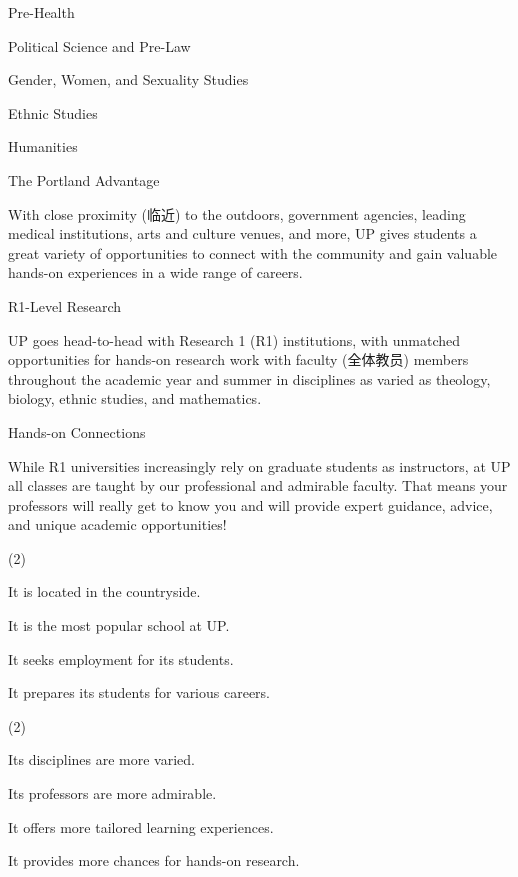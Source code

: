\documentclass{英语试卷}
\begin{document}
\par Pre-Health\par
\par Political Science and Pre-Law\par
\par Gender, Women, and Sexuality Studies\par
\par Ethnic Studies\par
\par Humanities\par
\par The Portland Advantage\par
\par With close proximity (临近) to the outdoors, government agencies, leading medical institutions, arts and culture venues, and more, UP gives students a great variety of opportunities to connect with the community and gain valuable hands-on experiences in a wide range of careers.\par
\par R1-Level Research\par
\par UP goes head-to-head with Research 1 (R1) institutions, with unmatched opportunities for hands-on research work with faculty (全体教员) members throughout the academic year and summer in disciplines as varied as theology, biology, ethnic studies, and mathematics.\par
\par Hands-on Connections\par
\par While R1 universities increasingly rely on graduate students as instructors, at UP all classes are taught by our professional and admirable faculty. That means your professors will really get to know you and will provide expert guidance, advice, and unique academic opportunities!\par
{}
\begin{choices}(2)
  \item It is located in the countryside.
  \item It is the most popular school at UP.
  \item It seeks employment for its students.
  \item It prepares its students for various careers.
\end{choices}
\begin{choices}(2)
  \item Its disciplines are more varied.
  \item Its professors are more admirable.
  \item It offers more tailored learning experiences.
  \item It provides more chances for hands-on research.
\end{choices}
\end{document}
